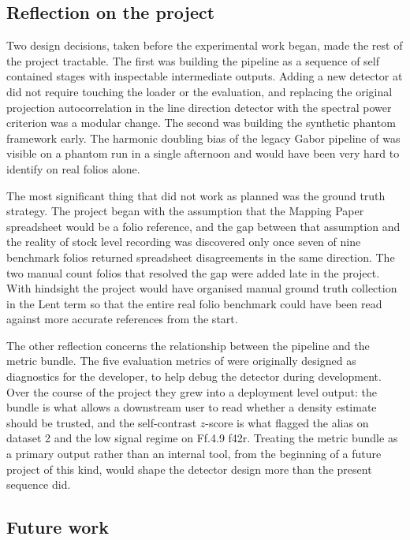 \subsection{Reflection on the project}
\label{sec:conclusion:reflection}

Two design decisions, taken before the experimental work began,
made the rest of the project tractable. The first was building
the pipeline as a sequence of self contained stages with
inspectable intermediate outputs. Adding a new detector at
 did not require touching the loader or the
evaluation, and replacing the original projection autocorrelation
in the line direction detector with the spectral power criterion
was a modular change. The second was building the synthetic
phantom framework early. The harmonic doubling bias of the legacy
Gabor pipeline of  was visible on
a phantom run in a single afternoon and would have been very hard
to identify on real folios alone.

The most significant thing that did not work as planned was the
ground truth strategy. The project began with the assumption that
the Mapping Paper spreadsheet would be a folio reference, and
the gap between that assumption and the reality of stock level
recording was discovered only once seven of nine benchmark folios
returned spreadsheet disagreements in the same direction. The two
manual count folios that resolved the gap were added late in the
project. With hindsight the project would have organised manual
ground truth collection in the Lent term so that the entire
real folio benchmark could have been read against more accurate
references from the start.

The other reflection concerns the relationship between the
pipeline and the metric bundle. The five evaluation metrics of
 were originally designed as
diagnostics for the developer, to help debug the detector during
development. Over the course of the project they grew into a
deployment level output: the bundle is what allows a downstream
user to read whether a density estimate should be trusted, and the
self-contrast $z$-score is what flagged the alias on dataset 2 and
the low signal regime on Ff.4.9 f42r. Treating the metric bundle
as a primary output rather than an internal tool, from the
beginning of a future project of this kind, would shape the
detector design more than the present sequence did.

\subsection{Future work}
\label{sec:conclusion:future}

